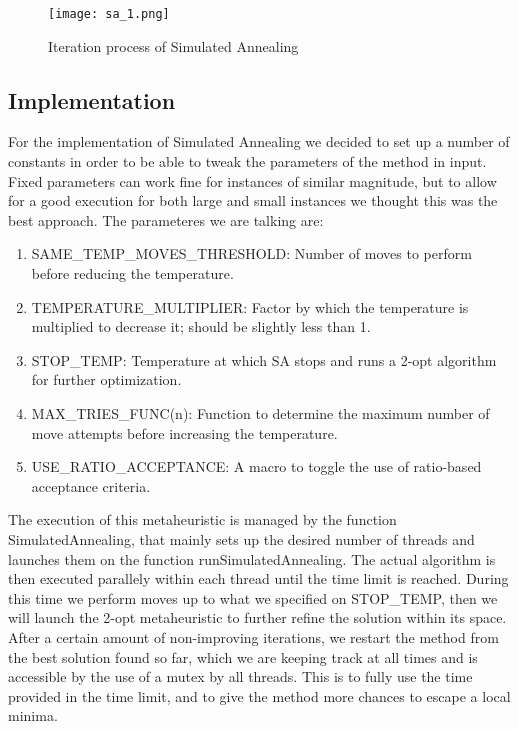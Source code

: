 \begin{figure}
    \centering
    \texttt{[image: sa\_1.png]}
    \caption{Iteration process of Simulated Annealing}
    \label{fig:sa}
\end{figure}

\subsection{Implementation}
For the implementation of Simulated Annealing we decided to set up a number of constants in order to be able to tweak the parameters of the 
method in input. Fixed parameters can work fine for instances of similar magnitude, but to allow for a good execution for both large and small 
instances we thought this was the best approach. The parameteres we are talking are:

\begin{enumerate}
    \item SAME_TEMP_MOVES_THRESHOLD: Number of moves to perform before reducing the temperature.
    \item TEMPERATURE_MULTIPLIER: Factor by which the temperature is multiplied to decrease it; should be slightly less than 1.
    \item STOP_TEMP: Temperature at which SA stops and runs a 2-opt algorithm for further optimization.
    \item MAX_TRIES_FUNC(n): Function to determine the maximum number of move attempts before increasing the temperature.
    \item USE_RATIO_ACCEPTANCE: A macro to toggle the use of ratio-based acceptance criteria.
\end{enumerate}


The execution of this metaheuristic is managed by the function SimulatedAnnealing, that mainly sets up the desired number of threads and launches them 
on the function runSimulatedAnnealing. 
The actual algorithm is then executed parallely within each thread until the time limit is reached. During this time we perform moves up to what we 
specified on STOP_TEMP, then we will launch the 2-opt metaheuristic to further refine the solution within its space. 
After a certain amount of non-improving iterations, we restart the method from the best solution found so far, which we are keeping track at all 
times and is accessible by the use of a mutex by all threads. This is to fully use the time provided in the time limit, and to give the method more chances to escape a local minima.


